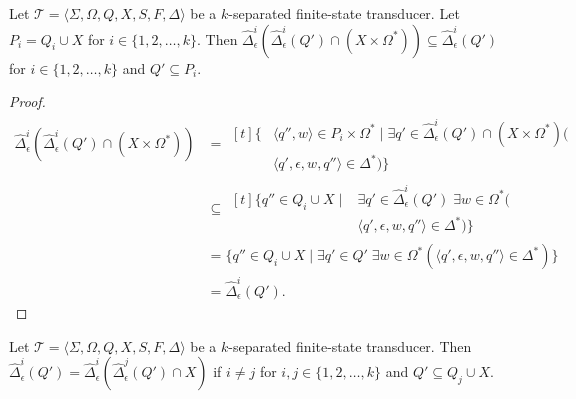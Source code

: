 \begin{proposition}
  Let $\mathcal{T} = \langle \Sigma, \Omega, Q, X, S, F, \Delta \rangle$ be a
  $k$-separated finite-state transducer. Let $P_i = Q_i \cup X$ for $i \in \{ 1, 2,
  \ldots, k \}$. Then $\hat{\Delta}_\epsilon^i(\hat{\Delta}_\epsilon^i(Q') \cap (X
  \times \Omega^*)) \subseteq \hat{\Delta}_\epsilon^i(Q')$ for $i \in \{ 1, 2,
  \ldots, k \}$ and $Q' \subseteq P_i$.
\end{proposition}

\begin{proof}
  \begin{align*}
    \hat{\Delta}_\epsilon^i(\hat{\Delta}_\epsilon^i(Q') \cap (X \times \Omega^*))
    &= \begin{aligned}[t]
      \{ &\langle q'', w \rangle \in P_i \times \Omega^* \mid \exists q' \in
      \hat{\Delta}_\epsilon^i(Q') \cap (X \times \Omega^*)(\\
      &\langle q', \epsilon, w, q'' \rangle \in \Delta^*) \}
    \end{aligned}                                    \\
     & \subseteq \begin{aligned}[t]
      \{ q'' \in Q_i \cup X \mid & \exists q' \in
      \hat{\Delta}_\epsilon^i(Q') \; \exists w \in \Omega^* (                            \\
                                 & \langle q', \epsilon, w, q'' \rangle \in \Delta^*) \}
    \end{aligned}                            \\
     & = \{ q'' \in Q_i \cup X \mid \exists q' \in Q' \; \exists w \in
    \Omega^* (\langle q', \epsilon, w, q'' \rangle \in \Delta^*) \}    \\
     & = \hat{\Delta}_\epsilon^i(Q').
  \end{align*}
\end{proof}

\begin{proposition}
  Let $\mathcal{T} = \langle \Sigma, \Omega, Q, X, S, F, \Delta \rangle$ be a
  $k$-separated finite-state transducer. Then $\hat{\Delta}_\epsilon^i(Q') =
    \hat{\Delta}_\epsilon^i(\hat{\Delta}_\epsilon^j(Q') \cap X)$ if $i \neq j$
  for $i, j \in \{ 1, 2, \ldots, k \}$ and $Q' \subseteq Q_j \cup X$.
\end{proposition}

